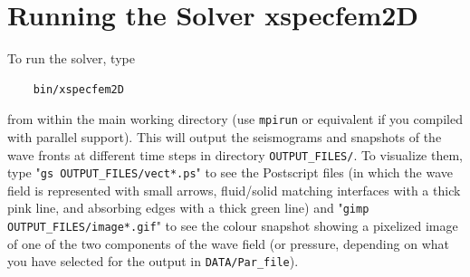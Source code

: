 
\chapter{Running the Solver xspecfem2D}


To run the solver, type
%
\begin{verbatim}
    bin/xspecfem2D
\end{verbatim}
%
from within the main working directory (use \texttt{mpirun} or equivalent if you compiled with parallel support). This will output the seismograms and snapshots of the wave fronts at different time steps in directory \texttt{OUTPUT\_FILES/}. To visualize them, type "\texttt{gs OUTPUT\_FILES/vect*.ps}" to see the Postscript files (in which the wave field is represented with small arrows, fluid/solid matching interfaces with a thick pink line, and absorbing edges with a thick green line) and "\texttt{gimp OUTPUT\_FILES/image*.gif}" to see the colour snapshot showing a pixelized image of one of the two components of the wave field (or pressure, depending on what you have selected for the output in \texttt{DATA/Par\_file}).


